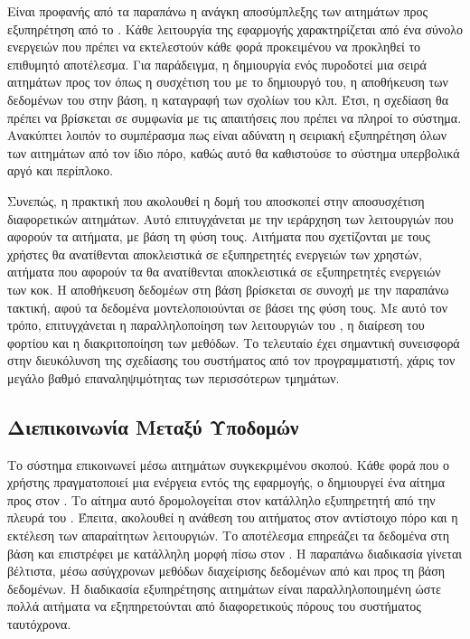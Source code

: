 Είναι προφανής από τα παραπάνω η ανάγκη αποσύμπλεξης των αιτημάτων προς εξυπηρέτηση από το . Κάθε λειτουργία της εφαρμογής χαρακτηρίζεται από ένα σύνολο ενεργειών που πρέπει να εκτελεστούν κάθε φορά προκειμένου να προκληθεί το επιθυμητό αποτέλεσμα. Για παράδειγμα, η δημιουργία ενός  πυροδοτεί μια σειρά αιτημάτων προς τον  όπως η συσχέτιση του  με το δημιουργό του, η αποθήκευση των δεδομένων του  στην βάση, η καταγραφή των σχολίων του  κλπ. Έτσι, η σχεδίαση θα πρέπει να βρίσκεται σε συμφωνία με τις απαιτήσεις που πρέπει να πληροί το σύστημα. Ανακύπτει λοιπόν το συμπέρασμα πως είναι αδύνατη η σειριακή εξυπηρέτηση όλων των αιτημάτων από τον ίδιο πόρο, καθώς αυτό θα καθιστούσε το σύστημα υπερβολικά αργό και περίπλοκο.

Συνεπώς, η πρακτική που ακολουθεί η δομή του  αποσκοπεί στην αποσυσχέτιση διαφορετικών αιτημάτων. Αυτό επιτυγχάνεται με την ιεράρχηση των λειτουργιών που αφορούν τα αιτήματα, με βάση τη φύση τους. Αιτήματα που σχετίζονται με τους χρήστες θα ανατίθενται αποκλειστικά σε εξυπηρετητές ενεργειών των χρηστών, αιτήματα που αφορούν τα  θα ανατίθενται αποκλειστικά σε εξυπηρετητές ενεργειών των  κοκ. Η αποθήκευση δεδομέων στη βάση βρίσκεται σε συνοχή με την παραπάνω τακτική, αφού τα δεδομένα μοντελοποιούνται σε  βάσει της φύση τους.  Με αυτό τον τρόπο, επιτυγχάνεται η παραλληλοποίηση των λειτουργιών του , η διαίρεση του φορτίου και η διακριτοποίηση των μεθόδων. Το τελευταίο έχει σημαντική συνεισφορά στην διευκόλυνση της σχεδίασης του συστήματος από τον προγραμματιστή, χάρις τον μεγάλο βαθμό επαναληψιμότητας των περισσότερων τμημάτων. 


\subsection{Διεπικοινωνία Μεταξύ Υποδομών}
Το σύστημα  επικοινωνεί μέσω αιτημάτων συγκεκριμένου σκοπού. Κάθε φορά που ο χρήστης πραγματοποιεί μια ενέργεια εντός της εφαρμογής, ο  δημιουργεί ένα αίτημα προς στον . Το αίτημα αυτό δρομολογείται στον κατάλληλο εξυπηρετητή από την πλευρά του . Έπειτα, ακολουθεί η ανάθεση του αιτήματος στον αντίστοιχο πόρο και η εκτέλεση των απαραίτητων λειτουργιών. Το αποτέλεσμα επηρεάζει τα δεδομένα στη βάση και επιστρέφει με κατάλληλη μορφή πίσω στον . Η παραπάνω διαδικασία γίνεται βέλτιστα, μέσω ασύγχρονων μεθόδων διαχείρισης δεδομένων από και προς τη βάση δεδομένων. Η διαδικασία εξυπηρέτησης αιτημάτων είναι παραλληλοποιημένη ώστε πολλά αιτήματα να εξηπηρετούνται από διαφορετικούς πόρους του συστήματος ταυτόχρονα.

















